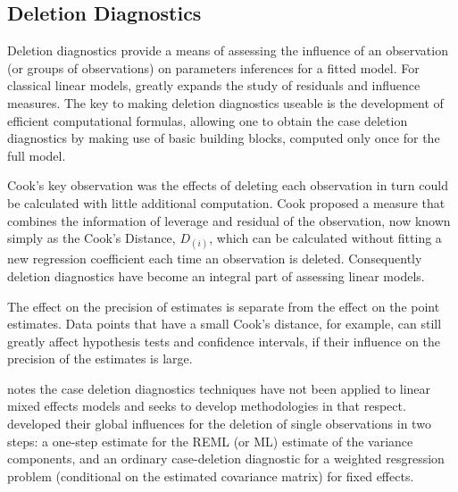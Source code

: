 \documentclass[12pt, a4paper]{report}
\theoremstyle{definition}
\theoremstyle{remark}
\begin{document}
\subsection{Deletion Diagnostics}


Deletion diagnostics provide a means of assessing the influence of an observation (or groups of observations) on parameters inferences for a fitted model. For classical linear models, \citet{cook77} greatly expands the study of residuals and influence measures. The key to making deletion diagnostics useable is the development of efficient computational formulas, allowing one to obtain the  case deletion diagnostics by making use of basic building blocks, computed only once for the full model.


Cook's key observation was the effects of deleting each observation in turn could be calculated with little additional computation. Cook proposed a measure that combines the information of leverage and residual of the observation, now known simply as the Cook's Distance, $D_{(i)}$, which can be calculated without fitting a new regression coefficient each time an observation is deleted. Consequently deletion diagnostics have become an integral part of assessing linear models.

The effect on the precision of estimates is separate from the effect on the point estimates. Data points that have a small Cook's distance, for example, can still greatly affect hypothesis tests and confidence intervals, if their influence on the precision of the estimates is large.


\citet{Christensen} notes the case deletion diagnostics techniques have not been applied to linear mixed effects models and seeks to develop methodologies in that respect. \citet{Christensen} developed their global influences for the deletion of single observations in two steps: a one-step estimate for the REML (or ML) estimate of the variance components, and an ordinary case-deletion diagnostic for a weighted resgression problem (conditional on the estimated covariance matrix) for fixed effects.
\end{document}
